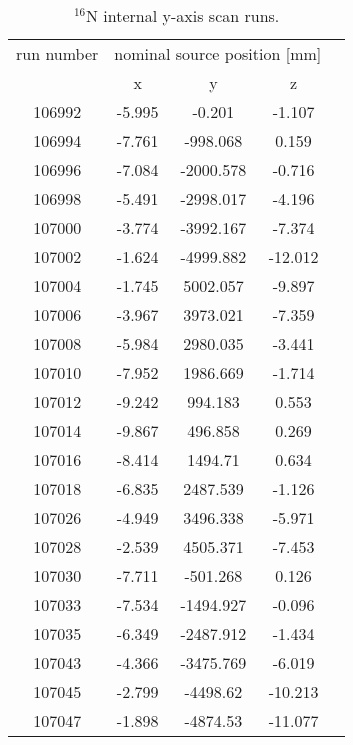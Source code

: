 \begin{table}[ht]
		\caption[$^{16}$N internal y-axis scan runs.]{$^{16}$N internal y-axis scan runs.\label{table:n16scanTable_yscan}}
				\vspace{2mm}
				\centering
	\begin{tabular*}{90mm}{c@{\extracolsep{\fill}}*4c}
		\toprule 
		run number  & \multicolumn{3}{c}{nominal source position [mm]}  \\
		\cline{2-4}
		& x & y & z\\
		\midrule        
        106992 & -5.995 & -0.201 & -1.107\\
        106994 & -7.761 & -998.068 & 0.159\\
        106996 & -7.084 & -2000.578 & -0.716\\
        106998 & -5.491 & -2998.017 & -4.196\\
        107000 & -3.774 & -3992.167 & -7.374\\
        107002 & -1.624 & -4999.882 & -12.012\\
        107004 & -1.745 & 5002.057 & -9.897\\
        107006 & -3.967 & 3973.021 & -7.359\\
        107008 & -5.984 & 2980.035 & -3.441\\
        107010 & -7.952 & 1986.669 & -1.714\\
        107012 & -9.242 & 994.183 & 0.553\\
        107014 & -9.867 & 496.858 & 0.269\\
        107016 & -8.414 & 1494.71 & 0.634\\
        107018 & -6.835 & 2487.539 & -1.126\\
        107026 & -4.949 & 3496.338 & -5.971\\
        107028 & -2.539 & 4505.371 & -7.453\\
        107030 & -7.711 & -501.268 & 0.126\\
        107033 & -7.534 & -1494.927 & -0.096\\
        107035 & -6.349 & -2487.912 & -1.434\\
        107043 & -4.366 & -3475.769 & -6.019\\
        107045 & -2.799 & -4498.62 & -10.213\\
        107047 & -1.898 & -4874.53 & -11.077\\
        		\bottomrule	
       	\end{tabular*}
   \end{table} 

